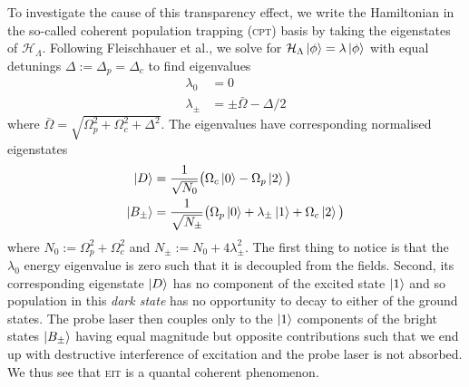     To investigate the cause of this transparency effect, we write the
    Hamiltonian in the so-called coherent population trapping (\textsc{cpt})
    basis by taking the eigenstates of $\mathcal{H}_\Lambda$. Following
    Fleischhauer et al.\cite{Fleischhauer2005}, we solve for $\mathcal{H}_\Lambda
    \Ket{\phi} = \lambda \Ket{\phi}$ with equal detunings $\Delta := \Delta_p =
    \Delta_c$ to find eigenvalues
    \begin{subequations}
      \begin{align}
      \lambda_0 &= 0 \\
      \lambda_\pm &= \pm \bar{\Omega} -\Delta/2 
      \end{align}
      \label{eqn:lambda_eigvals}
    \end{subequations}
    where $\bar{\Omega}= \sqrt{\Omega_p^2 + \Omega_c^2 + \Delta^2}$. The
    eigenvalues have corresponding normalised eigenstates 
    \begin{subequations}
      \begin{align}
        \Ket{D} &= \frac{1}{\sqrt{N_0}} \big( \Omega_c \Ket{0} - \Omega_p 
        \Ket{2} \big) \\
        \Ket{B_\pm} &= \frac{1}{\sqrt{N_\pm}} \big( \Omega_p \Ket{0} + 
          \lambda_\pm \Ket{1} + \Omega_c \Ket{2} \big)
      \end{align}
      \label{eqn:lambda_eigvects}
    \end{subequations}
    where $N_0 := \Omega_p^2 + \Omega_c^2$ and $N_\pm := N_0 + 4 \lambda_\pm^2$.
    The first thing to notice is that the $\lambda_0$ energy eigenvalue is zero
    such that it is decoupled from the fields. Second, its corresponding
    eigenstate $\Ket{D}$ has no component of the excited state $\Ket{1}$ and so
    population in this \textit{dark state} has no opportunity to decay to either
    of the ground states. The probe laser then couples only to the $\Ket{1}$
    components of the bright states $\Ket{B_\pm}$ having equal magnitude but
    opposite contributions such that we end up with destructive interference of
    excitation and the probe laser is not absorbed. We thus see that
    \textsc{eit} is a quantal coherent phenomenon.

    



